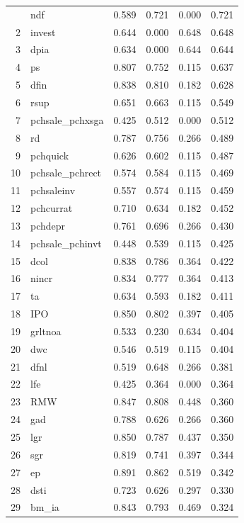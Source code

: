\documentclass[12pt]{article}
\begin{document}
\begin{footnotesize}
\begin{longtable}{rl|c|c|c|c}
	
		\hline\hline
		\endfoot
		1 & ndf & 0.589 & 0.721 & 0.000 & 0.721 \\ 
		2 & invest & 0.644 & 0.000 & 0.648 & 0.648 \\ 
		3 & dpia & 0.634 & 0.000 & 0.644 & 0.644 \\ 
		4 & ps & 0.807 & 0.752 & 0.115 & 0.637 \\ 
		5 & dfin & 0.838 & 0.810 & 0.182 & 0.628 \\ 
		6 & rsup & 0.651 & 0.663 & 0.115 & 0.549 \\ 
		7 & pchsale\_pchxsga & 0.425 & 0.512 & 0.000 & 0.512 \\ 
		8 & rd & 0.787 & 0.756 & 0.266 & 0.489 \\ 
		9 & pchquick & 0.626 & 0.602 & 0.115 & 0.487 \\ 
		10 & pchsale\_pchrect & 0.574 & 0.584 & 0.115 & 0.469 \\ 
		11 & pchsaleinv & 0.557 & 0.574 & 0.115 & 0.459 \\ 
		12 & pchcurrat & 0.710 & 0.634 & 0.182 & 0.452 \\ 
		13 & pchdepr & 0.761 & 0.696 & 0.266 & 0.430 \\ 
		14 & pchsale\_pchinvt & 0.448 & 0.539 & 0.115 & 0.425 \\ 
		15 & dcol & 0.838 & 0.786 & 0.364 & 0.422 \\ 
		16 & nincr & 0.834 & 0.777 & 0.364 & 0.413 \\ 
		17 & ta & 0.634 & 0.593 & 0.182 & 0.411 \\ 
		18 & IPO & 0.850 & 0.802 & 0.397 & 0.405 \\ 
		19 & grltnoa & 0.533 & 0.230 & 0.634 & 0.404 \\ 
		20 & dwc & 0.546 & 0.519 & 0.115 & 0.404 \\ 
		21 & dfnl & 0.519 & 0.648 & 0.266 & 0.381 \\ 
		22 & lfe & 0.425 & 0.364 & 0.000 & 0.364 \\ 
		23 & RMW & 0.847 & 0.808 & 0.448 & 0.360 \\ 
		24 & gad & 0.788 & 0.626 & 0.266 & 0.360 \\ 
		25 & lgr & 0.850 & 0.787 & 0.437 & 0.350 \\ 
		26 & sgr & 0.819 & 0.741 & 0.397 & 0.344 \\ 
		27 & ep & 0.891 & 0.862 & 0.519 & 0.342 \\ 
		28 & dsti & 0.723 & 0.626 & 0.297 & 0.330 \\ 
		29 & bm\_ia & 0.843 & 0.793 & 0.469 & 0.324 \\ 

\end{longtable}
\end{footnotesize}
\end{document}
